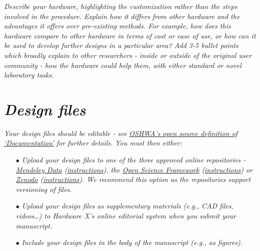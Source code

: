 \documentclass[11pt, letterpaper]{article}
\begin{document}
\textit{Describe your hardware, highlighting the customization rather than the steps involved in the procedure. Explain how it differs from other hardware and the advantages it offers over pre-existing methods. For example, how does this hardware compare to other hardware in terms of cost or ease of use, or how can it be used to develop further designs in a particular area? 
\vskip 0.3cm \noindent
Add 3-5 bullet points which broadly explain to other researchers - inside or outside of the original user community - how the hardware could help them, with either standard or novel laboratory tasks.}

\section*{\textit{Design files}}


\textit{Your design files should be editable - see \href{https://www.oshwa.org/definition/}{OSHWA’s open source definition of ‘Documentation’} for further details. You must then either:}
\begin{itemize}
\item[$\bullet$]{\it Upload your design files to one of the three approved online repositories - \href{https://data.mendeley.com/}{Mendeley Data} (\href{https://doi.org/10.5281/zenodo.3346799}{instructions}), the \href{https://osf.io/}{Open Science Framework} (\href{https://osf.io/wgk7q/wiki/home/}{instructions}) or \href{https://zenodo.org/}{Zenodo} (\href{https://doi.org/10.5281/zenodo.3346799}{instructions}). We recommend this option as the repositories support versioning of files.}
\item[$\bullet$]{\it Upload your design files as supplementary materials (e.g., CAD files, videos…) to Hardware X’s online editorial system when you submit your manuscript.}
\item[$\bullet$]{\it Include your design files in the body of the manuscript (e.g., as figures).}
\end{itemize}
\end{document}
